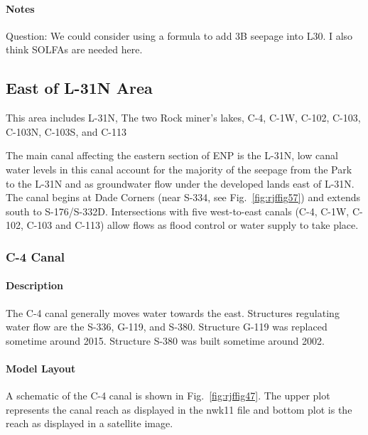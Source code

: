 \begin{notes}
\paragraph{Notes}
Question: We could consider using a formula to add 3B seepage into L30.
I also think SOLFAs are needed here.
\end{notes}

\clearpage



\subsection{East of L-31N Area}
This area includes L-31N, The two Rock miner's lakes, C-4, C-1W, C-102, C-103, C-103N, C-103S, and C-113

The main canal affecting the eastern section of ENP is the L-31N, low canal water levels in this canal account for the majority of the seepage from the Park to the L-31N and as groundwater flow under the developed lands east of L-31N. The canal begins at Dade Corners (near S-334, see Fig.~\ref{fig:rjffig57}) and extends south to S-176/S-332D. Intersections with five west-to-east canals (C-4, C-1W, C-102, C-103 and C-113) allow flows as flood control or water supply to take place.


\clearpage
\subsubsection{C-4 Canal}
\paragraph{Description}
The C-4 canal generally moves water towards the east. Structures regulating water flow are the S-336, G-119, and S-380.  Structure G-119 was replaced sometime around 2015.  Structure S-380 was built sometime around 2002.

\paragraph{Model Layout}
A schematic of the C-4 canal is shown in Fig.~\ref{fig:rjffig47}. The upper plot represents the canal reach as displayed in the nwk11 file and bottom plot is the reach as displayed in a satellite image.


